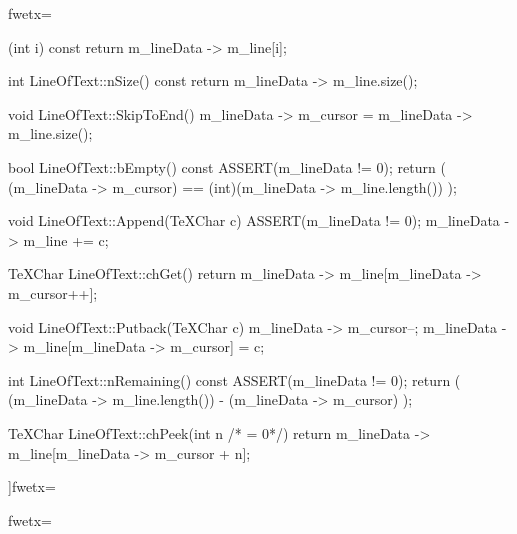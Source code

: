 \fwbeginmacro
{}\fwplusequals \fwodef {}fwetx=%
\fwcdef 
\fwbeginmacronotes
{}
\fwendmacronotes
\fwendmacro



\fwbeginmacro
{}\fwplusequals \fwodef \fwbtx[
LineOfText::~LineOfText()
{
   delete m_lineData;
   m_lineData = 0;
}

void LineOfText::Clear()
{
   m_lineData -> m_cursor = 0;
   m_lineData -> m_line.resize(0);
}

TeXChar LineOfText::operator[](int i) const
{
   return m_lineData -> m_line[i];
}

int  LineOfText::nSize() const
{
   return m_lineData -> m_line.size();
}

void LineOfText::SkipToEnd()
{
   m_lineData -> m_cursor = m_lineData -> m_line.size();
}

bool LineOfText::bEmpty() const
{
   ASSERT(m_lineData != 0);
   return ( (m_lineData -> m_cursor) == (int)(m_lineData -> m_line.length()) );
}

void LineOfText::Append(TeXChar c)
{
   ASSERT(m_lineData != 0);
   m_lineData -> m_line += c;
}

TeXChar LineOfText::chGet()
{
   return m_lineData -> m_line[m_lineData -> m_cursor++];
}

void LineOfText::Putback(TeXChar c)
{
   m_lineData -> m_cursor--;
   m_lineData -> m_line[m_lineData -> m_cursor] = c;
}

int LineOfText::nRemaining() const
{
   ASSERT(m_lineData != 0);
   return ( (m_lineData -> m_line.length()) - (m_lineData -> m_cursor) );
}

TeXChar LineOfText::chPeek(int n /* = 0*/)
{
   return m_lineData -> m_line[m_lineData -> m_cursor + n];
}

]fwetx=%
\fwcdef 
\fwbeginmacronotes
{}
\fwendmacronotes
\fwendmacro


\fwbeginmacro
{}\fwplusequals \fwodef \fwbtx[#ifdef LOGGING
   LogFile& operator<<(LogFile& f, const LineOfText& t)
   {
       for (int i = 0; i < t.nSize(); ++i){
           f << t[i];
       }

       return f;
   }
#endif
]fwetx=%
\fwcdef 
\fwbeginmacronotes
{}
\fwendmacronotes
\fwendmacro





